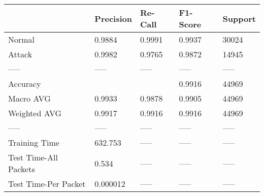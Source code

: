 \begin{tabular}{lllll}
\toprule
{} & Precision & Re-Call & F1-Score & Support \\
\midrule
Normal                &    0.9884 &  0.9991 &   0.9937 &   30024 \\
Attack                &    0.9982 &  0.9765 &   0.9872 &   14945 \\
-----                 &     ----- &   ----- &    ----- &   ----- \\
Accuracy              &           &         &   0.9916 &   44969 \\
Macro AVG             &    0.9933 &  0.9878 &   0.9905 &   44969 \\
Weighted AVG          &    0.9917 &  0.9916 &   0.9916 &   44969 \\
-----                 &     ----- &   ----- &    ----- &   ----- \\
Training Time         &   632.753 &   ----- &    ----- &   ----- \\
Test Time-All Packets &     0.534 &   ----- &    ----- &   ----- \\
Test Time-Per Packet  &  0.000012 &   ----- &    ----- &   ----- \\
\bottomrule
\end{tabular}
